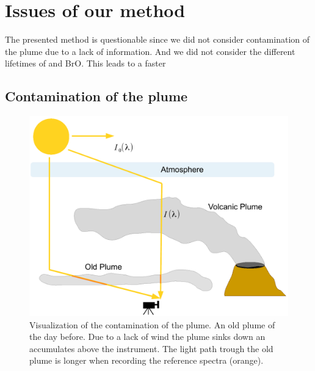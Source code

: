 \documentclass  [
  paper    = a4,
  BCOR     = 10mm,
  twoside,
  fontsize = 12pt,
  fleqn,
  toc      = bibnumbered,
  toc      = listofnumbered,
  numbers  = noendperiod,
  headings = normal,
  listof   = leveldown,
  version  = 3.03
]                                       {scrreprt}
\begin{document}
	\section{Issues of our method}
	The presented method is questionable since we did not consider contamination of the plume due to a lack of information. And we did not consider the different lifetimes of  and BrO. This leads to a faster 
	
	\subsection{Contamination of the plume}
	\begin{figure}
		\centering
		\includegraphics[width=0.7\linewidth]{Bilder/Contaminationplume}
		\caption{Visualization of the contamination of the plume. An old plume of the day before. Due to a lack of wind the plume sinks down an accumulates above the instrument. The light path trough the old plume is longer when recording the reference spectra (orange).}
		\label{fig:contaminationplume}
	\end{figure}
\end{document}
